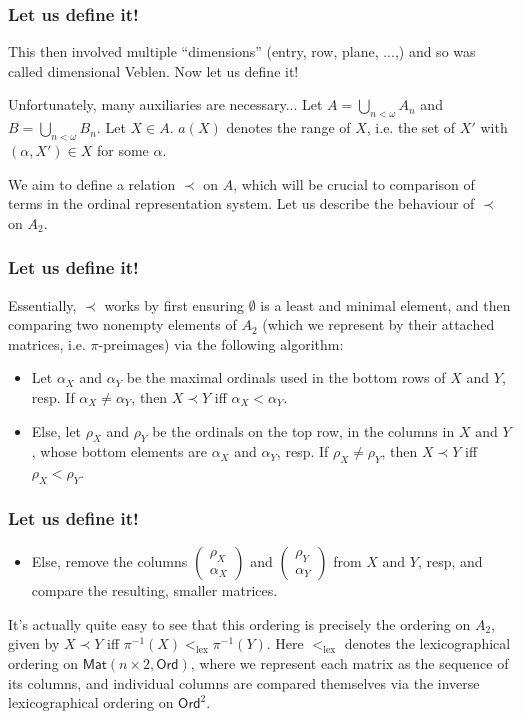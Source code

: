 \documentclass{beamer}
\begin{document}
\begin{frame}
\frametitle{Let us define it!}
This then involved multiple ``dimensions'' (entry, row, plane, ...,) and so was called dimensional Veblen. Now let us define it!

Unfortunately, many auxiliaries are necessary... Let $A = \bigcup_{n < \omega} A_n$ and $B = \bigcup_{n < \omega} B_n$. Let $X \in A$. $a(X)$ denotes the range of $X$, i.e. the set of $X'$ with $(\alpha, X') \in X$ for some $\alpha$.

We aim to define a relation $\prec$ on $A$, which will be crucial to comparison of terms in the ordinal representation system. Let us describe the behaviour of $\prec$ on $A_2$.
\end{frame}

\begin{frame}
\frametitle{Let us define it!}
Essentially, $\prec$ works by first ensuring $\emptyset$ is a least and minimal element, and then comparing two nonempty elements of $A_2$ (which we represent by their attached matrices, i.e. $\pi$-preimages) via the following algorithm:

\begin{itemize}
    \item Let $\alpha_X$ and $\alpha_Y$ be the maximal ordinals used in the bottom rows of $X$ and $Y$, resp. If $\alpha_X \neq \alpha_Y$, then $X \prec Y$ iff $\alpha_X < \alpha_Y$.
    \item Else, let $\rho_X$ and $\rho_Y$ be the ordinals on the top row, in the columns in $X$ and $Y$, whose bottom elements are $\alpha_X$ and $\alpha_Y$, resp. If $\rho_X \neq \rho_Y$, then $X \prec Y$ iff $\rho_X < \rho_Y$.
\end{itemize}
\end{frame}

\begin{frame}
\frametitle{Let us define it!}
\begin{itemize}
    \item Else, remove the columns $\left(\begin{matrix} \rho_X \\ \alpha_X \end{matrix}\right)$ and $\left(\begin{matrix} \rho_Y \\ \alpha_Y \end{matrix}\right)$ from $X$ and $Y$, resp, and compare the resulting, smaller matrices.
\end{itemize}

It's actually quite easy to see that this ordering is precisely the ordering on $A_2$, given by $X \prec Y$ iff $\pi^{-1}(X) <_{\mathrm{lex}} \pi^{-1}(Y)$. Here $<_{\mathrm{lex}}$ denotes the lexicographical ordering on $\mathsf{Mat}(n \times 2, \mathsf{Ord})$, where we represent each matrix as the sequence of its columns, and individual columns are compared themselves via the inverse lexicographical ordering on $\mathsf{Ord}^2$.
\end{frame}
\end{document}

